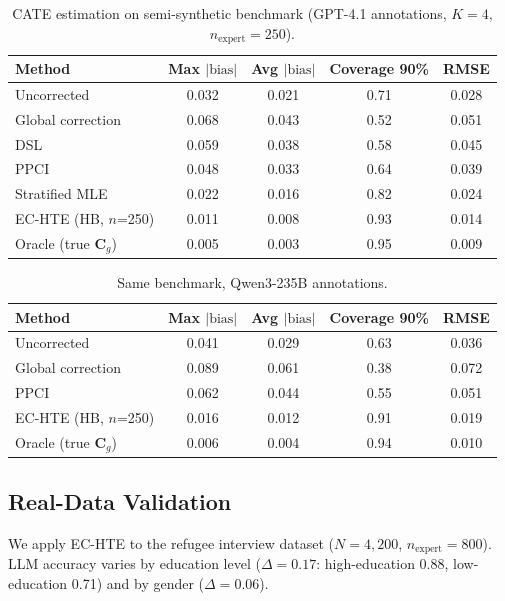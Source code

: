 \documentclass[11pt,a4paper]{article}
\begin{document}
\begin{table}[t]
\centering
\small
\caption{CATE estimation on semi-synthetic benchmark (GPT-4.1 annotations, $K=4$, $n_{\text{expert}}=250$).}
\label{tab:semi_gpt41}
\begin{tabular}{l cccc}
\toprule
Method & Max $|\text{bias}|$ & Avg $|\text{bias}|$ & Coverage 90\% & RMSE \\
\midrule
Uncorrected           & 0.032 & 0.021 & 0.71 & 0.028 \\
Global correction     & 0.068 & 0.043 & 0.52 & 0.051 \\
DSL \citeyearpar{egami2024dsl} & 0.059 & 0.038 & 0.58 & 0.045 \\
PPCI \citeyearpar{sui2026ppci} & 0.048 & 0.033 & 0.64 & 0.039 \\
Stratified MLE        & 0.022 & 0.016 & 0.82 & 0.024 \\
EC-HTE (HB, $n$=250)  & 0.011 & 0.008 & 0.93 & 0.014 \\
Oracle (true $\mathbf{C}_g$) & 0.005 & 0.003 & 0.95 & 0.009 \\
\bottomrule
\end{tabular}
\end{table}

\begin{table}[t]
\centering
\small
\caption{Same benchmark, Qwen3-235B annotations.}
\label{tab:semi_qwen3}
\begin{tabular}{l cccc}
\toprule
Method & Max $|\text{bias}|$ & Avg $|\text{bias}|$ & Coverage 90\% & RMSE \\
\midrule
Uncorrected           & 0.041 & 0.029 & 0.63 & 0.036 \\
Global correction     & 0.089 & 0.061 & 0.38 & 0.072 \\
PPCI \citeyearpar{sui2026ppci} & 0.062 & 0.044 & 0.55 & 0.051 \\
EC-HTE (HB, $n$=250)  & 0.016 & 0.012 & 0.91 & 0.019 \\
Oracle (true $\mathbf{C}_g$) & 0.006 & 0.004 & 0.94 & 0.010 \\
\bottomrule
\end{tabular}
\end{table}

\subsection{Real-Data Validation}
\label{sec:real_data}

We apply EC-HTE to the \citet{ashwin2025llm} refugee interview dataset ($N = 4{,}200$, $n_{\text{expert}} = 800$).
LLM accuracy varies by education level ($\Delta = 0.17$: high-education 0.88, low-education 0.71) and by gender ($\Delta = 0.06$).
\end{document}
